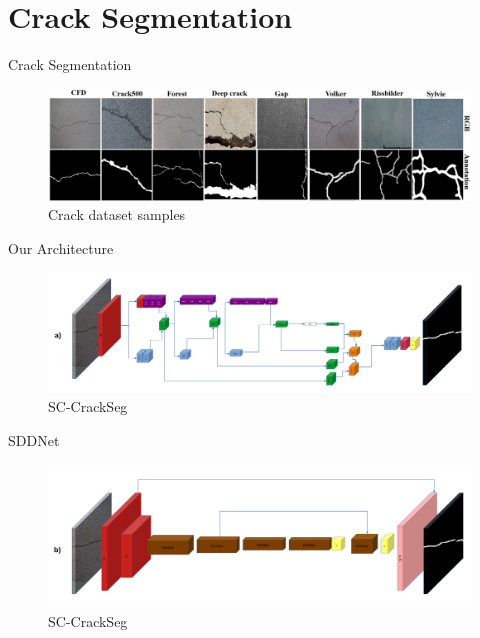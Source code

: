 \documentclass{lib/curtin_format}
\begin{document}
\section{Crack Segmentation}
\begin{frame}{Crack Segmentation}
    \vspace{0.1cm}
    \begin{figure}
        \centering
        \includegraphics[width=1.05\linewidth]{res/crack-dataset.png}
        \caption{Crack dataset samples}
        \label{fig:crack-dataset}
    \end{figure}
\end{frame}

\begin{frame}{Our Architecture}
    \vspace{0.1cm}
    \begin{figure}
        \centering
        \includegraphics[width=\textwidth]{res/sc-crackseg.pdf}
        \caption{SC-CrackSeg}
        \label{fig:sc-crackseg-versions-sc-crackseg}
    \end{figure}
\end{frame}

\begin{frame}{SDDNet}
    \vspace{0.1cm}
    \begin{figure}
        \centering
        \includegraphics[width=\textwidth]{res/sddnet.pdf}
        \caption{SC-CrackSeg}
        \label{fig:sc-crackseg-versions-sddnet}
    \end{figure}
\end{frame}
\end{document}
